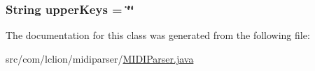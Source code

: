 \hypertarget{classcom_1_1lclion_1_1midiparser_1_1_m_i_d_i_parser_af186165a05dd64dd883a4697fd0b1d00}{
\subsubsection[{upper\+Keys}]{\setlength{\rightskip}{0pt plus 5cm}String upper\+Keys = \char`\"{}\char`\"{}\hspace{0.3cm}{\ttfamily [private]}}}\label{classcom_1_1lclion_1_1midiparser_1_1_m_i_d_i_parser_af186165a05dd64dd883a4697fd0b1d00}


The documentation for this class was generated from the following file\+:\begin{DoxyCompactItemize}
\item 
src/com/lclion/midiparser/\hyperlink{_m_i_d_i_parser_8java}{M\+I\+D\+I\+Parser.\+java}\end{DoxyCompactItemize}

